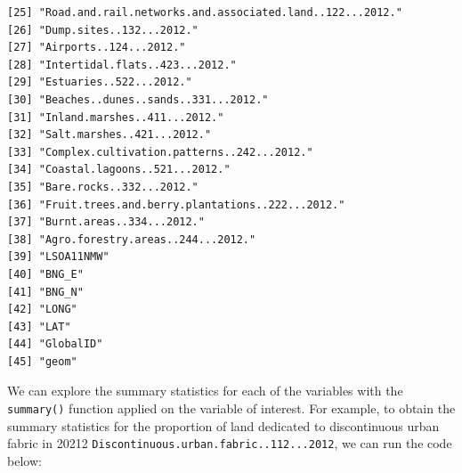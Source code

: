 \documentclass[
  letterpaper,
  DIV=11,
  numbers=noendperiod]{scrreprt}
\begin{document}
\begin{verbatim}
[25] "Road.and.rail.networks.and.associated.land..122...2012."                                            
[26] "Dump.sites..132...2012."                                                                            
[27] "Airports..124...2012."                                                                              
[28] "Intertidal.flats..423...2012."                                                                      
[29] "Estuaries..522...2012."                                                                             
[30] "Beaches..dunes..sands..331...2012."                                                                 
[31] "Inland.marshes..411...2012."                                                                        
[32] "Salt.marshes..421...2012."                                                                          
[33] "Complex.cultivation.patterns..242...2012."                                                          
[34] "Coastal.lagoons..521...2012."                                                                       
[35] "Bare.rocks..332...2012."                                                                            
[36] "Fruit.trees.and.berry.plantations..222...2012."                                                     
[37] "Burnt.areas..334...2012."                                                                           
[38] "Agro.forestry.areas..244...2012."                                                                   
[39] "LSOA11NMW"                                                                                          
[40] "BNG_E"                                                                                              
[41] "BNG_N"                                                                                              
[42] "LONG"                                                                                               
[43] "LAT"                                                                                                
[44] "GlobalID"                                                                                           
[45] "geom"                                                                                               
\end{verbatim}

We can explore the summary statistics for each of the variables with the
\texttt{summary()} function applied on the variable of interest. For
example, to obtain the summary statistics for the proportion of land
dedicated to discontinuous urban fabric in 20212
\texttt{Discontinuous.urban.fabric..112...2012}, we can run the code
below:
\end{document}
